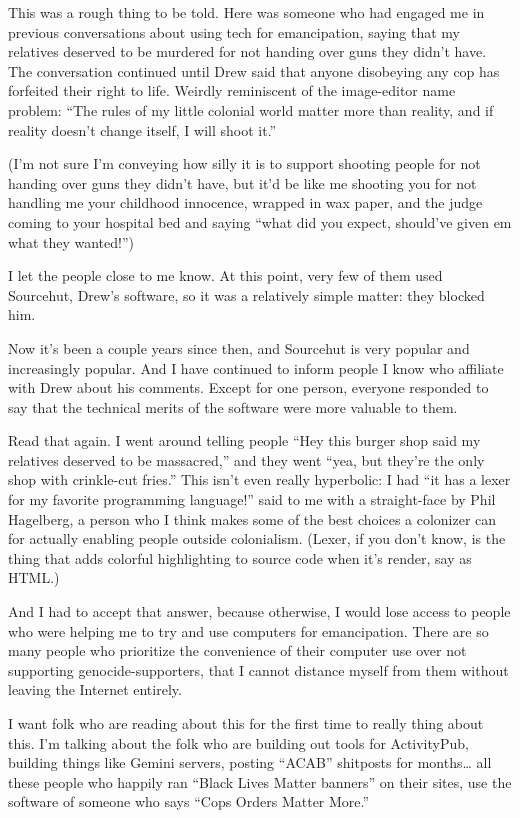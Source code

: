 \documentclass[11pt]{article}
\begin{document}
\begin{itemize}
This was a rough thing to be told. Here was someone who had engaged me in previous conversations about using tech for emancipation, saying that my relatives deserved to be murdered for not handing over guns they didn’t have. The conversation continued until Drew said that anyone disobeying any cop has forfeited their right to life. Weirdly reminiscent of the image-editor name problem: “The rules of my little colonial world matter more than reality, and if reality doesn’t change itself, I will shoot it.”

(I’m not sure I’m conveying how silly it is to support shooting people for not handing over guns they didn’t have, but it’d be like me shooting you for not handling me your childhood innocence, wrapped in wax paper, and the judge coming to your hospital bed and saying “what did you expect, should’ve given em what they wanted!”)

I let the people close to me know. At this point, very few of them used Sourcehut, Drew’s software, so it was a relatively simple matter: they blocked him.

Now it’s been a couple years since then, and Sourcehut is very popular and increasingly popular. And I have continued to inform people I know who affiliate with Drew about his comments. Except for one person, everyone responded to say that the technical merits of the software were more valuable to them.

Read that again. I went around telling people “Hey this burger shop said my relatives deserved to be massacred,” and they went “yea, but they’re the only shop with crinkle-cut fries.” This isn’t even really hyperbolic: I had “it has a lexer for my favorite programming language!” said to me with a straight-face by Phil Hagelberg, a person who I think makes some of the best choices a colonizer can for actually enabling people outside colonialism. (Lexer, if you don’t know, is the thing that adds colorful highlighting to source code when it’s render, say as HTML.)

And I had to accept that answer, because otherwise, I would lose access to people who were helping me to try and use computers for emancipation. There are so many people who prioritize the convenience of their computer use over not supporting genocide-supporters, that I cannot distance myself from them without leaving the Internet entirely.

I want folk who are reading about this for the first time to really thing about this. I’m talking about the folk who are building out tools for ActivityPub, building things like Gemini servers, posting “ACAB” shitposts for months… all these people who happily ran “Black Lives Matter banners” on their sites, use the software of someone who says “Cops Orders Matter More.”


\end{itemize}
\end{document}
